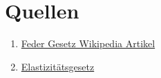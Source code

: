 \documentclass[../main.tex]{subfiles} %
\begin{document}
\chapter{Quellen}\label{ch:quellen}
    \begin{enumerate}
        \item \href{https://de.wikipedia.org/wiki/Hookesches_Gesetz}{Feder Gesetz Wikipedia Artikel}
        \item \href{https://de.wikipedia.org/wiki/Elastizit%C3%A4tsgesetz}{Elastizitätsgesetz}
    \end{enumerate}
\end{document}
